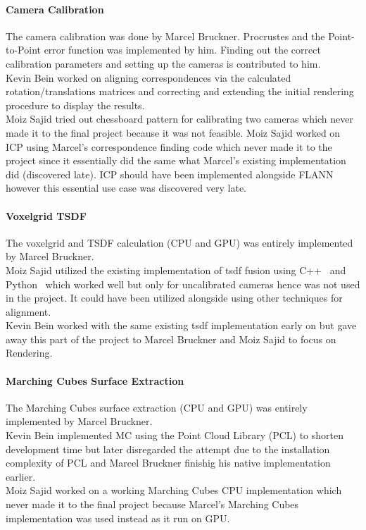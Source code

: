\documentclass[10pt,twocolumn,letterpaper]{article}
\begin{document}
\paragraph{Camera Calibration}
The camera calibration was done by Marcel Bruckner. Procrustes and the Point-to-Point error function was implemented by him. Finding out the correct calibration parameters and setting up the cameras is contributed to him.\\
Kevin Bein worked on aligning correspondences via the calculated rotation/translations matrices and correcting and extending the initial rendering procedure to display the results. \\
Moiz Sajid tried out chessboard pattern for calibrating two cameras which never made it to the final project because it was not feasible. Moiz Sajid worked on ICP using Marcel's correspondence finding code which never made it to the project since it essentially did the same what Marcel's existing implementation did (discovered late). ICP should have been implemented alongside FLANN however this essential use case was discovered very late.   

\paragraph{Voxelgrid TSDF}
The voxelgrid and TSDF calculation (CPU and GPU) was entirely implemented by Marcel Bruckner.\\
Moiz Sajid utilized the existing implementation of tsdf fusion using C++~\cite{Authors2} and Python~\cite{Authors8} which worked well but only for uncalibrated cameras hence was not used in the project. It could have been utilized alongside using other techniques for alignment. \\
Kevin Bein worked with the same existing tsdf implementation \cite{Authors2} early on but gave away this part of the project to Marcel Bruckner and Moiz Sajid to focus on Rendering.

\paragraph{Marching Cubes Surface Extraction}
The Marching Cubes surface extraction (CPU and GPU) was entirely implemented by Marcel Bruckner.\\
Kevin Bein implemented MC using the Point Cloud Library (PCL) to shorten development time but later disregarded the attempt due to the installation complexity of PCL and Marcel Bruckner finishig his native implementation earlier. \\
Moiz Sajid worked on a working Marching Cubes CPU implementation which never made it to the final project because Marcel's Marching Cubes implementation was used instead as it run on GPU. 
\end{document}
